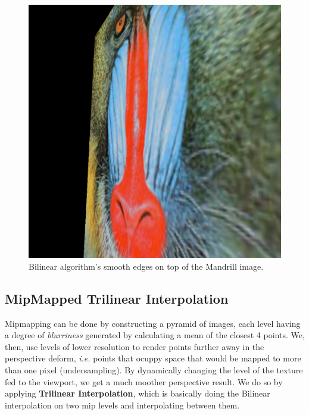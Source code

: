 \documentclass[twocolumn, 12pt]{article}
\newcommand{\ie}{\textit{i.e. }}
\begin{document}
\begin{figure}[htbp]
\centering
\includegraphics[width=\linewidth]{./res/Bilinear-mandrill.png}
\caption{\label{fig:Bilinear}Bilinear algorithm's smooth edges on top of the Mandrill image.}
\end{figure}

\subsection{MipMapped Trilinear Interpolation}
\label{sec:org73fa269}

Mipmapping can be done by constructing a pyramid of images, each
level having a degree of \emph{blurriness} generated by calculating a
mean of the closest 4 points. We, then, use levels of lower
resolution to render points further away in the perspective deform,
\ie points that ocuppy space that would be mapped to more than one
pixel (undersampling). By dynamically changing the level of the
texture fed to the viewport, we get a much moother perspective
result. We do so by applying \textbf{Trilinear Interpolation}, which is
basically doing the Bilinear interpolation on two mip levels and
interpolating between them.
\end{document}
